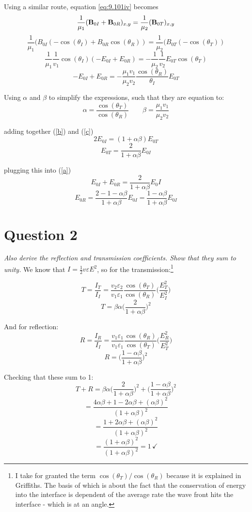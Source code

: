 \documentclass[12pt]{article}
\begin{document}
Using a similar route, equation \ref{eq:9.101iv} becomes
\[\frac{1}{\mu_1}(\vb{B}_{0I} + \vb{B}_{0R})_{x,y} = \frac{1}{\mu_2}(\vb{B}_{0T})_{x,y}\]
\[\frac{1}{\mu_1}(B_{0I}(-\cos(\theta_I) + B_{0R}\cos(\theta_R)) = \frac{1}{\mu_2}(B_{0T}(-\cos(\theta_T))\]
\[\frac{1}{\mu_1}\frac{1}{v_1}\cos(\theta_I)(-E_{0I} + E_{0R}) = -\frac{1}{\mu_2}\frac{1}{v_2}E_{0T}\cos(\theta_T)\]
\begin{equation}
	-E_{0I}+ E_{0R} = -\frac{\mu_1 v_1}{\mu_2 v_2}\frac{\cos(\theta_R)}{\theta_I} E_{0T}
	\label{c}
\end{equation}

Using $\alpha$ and $\beta$ to simplify the expressions, such that they are equation to:
\[\alpha = \frac{\cos(\theta_T)}{\cos(\theta_R)} \qquad \beta = \frac{\mu_1 v_1}{\mu_2 v_2}\]

adding together (\ref{b}) and (\ref{c})
\[2E_{0I} = (1+ \alpha \beta)E_{0T}\]
\[\boxed{E_{0T} = \frac{2}{1+\alpha \beta} E_{0I}}\]

plugging this into (\ref{a})
\[E_{0I} + E_{0R} = \frac{2}{1+\alpha \beta} E_0I\]
\[\boxed{E_{0R} = \frac{2-1-\alpha \beta}{1 + \alpha \beta} E_{0I} = \frac{1 - \alpha \beta}{1+ \alpha \beta} E_{0I}}\]

\section*{Question 2}
\emph{Also derive the reflection and transmission coefficients. Show that they sum to unity.}
We know that $I = \frac{1}{2}v \varepsilon E^2$, so for the transmission:\footnote{I take for granted the term $\cos(\theta_T)/\cos(\theta_R)$ because it is explained in Griffiths. The basis of which is about the fact that the conservation of energy into the interface is dependent of the average rate the wave front hits the interface - which is at an angle. }

\[T = \frac{I_T}{I_I} = \frac{v_2 \varepsilon_2}{v_1 \varepsilon_1} \frac{\cos(\theta_T)}{\cos(\theta_R)}\Big(\frac{E_T^2}{E_I^2}\Big)\]
\[\boxed{T = \beta \alpha \Big( \frac{2}{1 + \alpha \beta}\Big)^2}\]

And for reflection:
\[R = \frac{I_R}{I_I} = \frac{v_1 \varepsilon_1}{v_1 \varepsilon_1}\frac{\cos(\theta_R)}{\cos(\theta_T)}\Big(\frac{E_R^2}{E_T^2}\Big)\]
\[\boxed{R = \Big( \frac{1 - \alpha \beta}{1+ \alpha \beta}\Big)^2}\]

Checking that these sum to 1:
\[T+R = \beta \alpha \Big(\frac{2}{1+ \alpha \beta}\Big)^2 + \Big( \frac{1 - \alpha \beta}{1 + \alpha \beta}\Big)^2\]
\[= \frac{4 \alpha \beta + 1 - 2 \alpha \beta + (\alpha \beta)^2}{(1 + \alpha \beta)^2}\]
\[= \frac{1 + 2 \alpha \beta + (\alpha \beta)^2}{(1+ \alpha \beta)^2}\]
\[= \frac{(1+ \alpha \beta)^2}{(1 + \alpha \beta)^2} = 1 \, \checkmark\]
\end{document}
